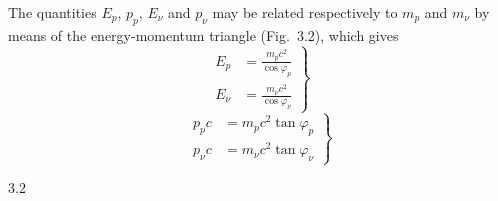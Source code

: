 The quantities $E_p$, $p_p$, $E_\nu$ and $p_\nu$ may be related respectively to $m_p$ and $m_\nu$ by means of the energy-momentum triangle (Fig.~3.2), which gives
\begin{equation}
\left.
\begin{aligned}
E_p &= \frac{m_pc^2}{\cos\varphi_p}\\[2pt]
E_\nu &= \frac{m_\nu c^2}{\cos\varphi_\nu}
\end{aligned}
\right\}\tag{A9}
\end{equation}
\begin{equation}
\left.
\begin{aligned}
p_pc &= m_pc^2\tan\varphi_p\\[2pt]
p_\nu c &= m_\nu c^2\tan\varphi_\nu
\end{aligned}
\right\}\tag{A10}
\end{equation}

\begin{figbox}{3.2}
\end{figbox}

